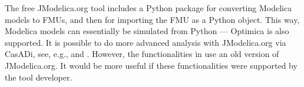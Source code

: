 The free JModelica.org tool includes a Python package for converting Modelica models to FMUs, and then for importing the FMU as a Python object. This way, Modelica models can essentially be simulated from Python — Optimica is also supported. It is possible to do more advanced analysis with JModelica.org via CasADi, see, e.g., \cite{pythonperera} and \cite{pythonpereraparameter}. However, the functionalities in \cite{pythonperera} use an old version of JModelica.org. It would be more useful if these functionalities were supported by the tool developer.





